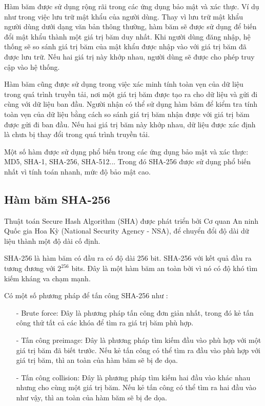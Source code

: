 Hàm băm được sử dụng rộng rãi trong các ứng dụng bảo mật và xác thực. Ví dụ như trong việc lưu trữ
mật khẩu của người dùng. Thay vì lưu trữ mật khẩu người dùng dưới dạng văn bản thông thường, hàm 
băm sẽ được sử dụng để biến đổi mật khẩu thành một giá trị băm duy nhất. Khi người dùng đăng nhập, 
hệ thống sẽ so sánh giá trị băm của mật khẩu được nhập vào với giá trị băm đã được lưu trữ. Nếu hai 
giá trị này khớp nhau, người dùng sẽ được cho phép truy cập vào hệ thống.

Hàm băm cũng được sử dụng trong việc xác minh tính toàn vẹn của dữ liệu trong quá trình truyền tải, 
nơi một giá trị băm được tạo ra cho dữ liệu và gửi đi cùng với dữ liệu ban đầu. Người nhận có thể 
sử dụng hàm băm để kiểm tra tính toàn vẹn của dữ liệu bằng cách so sánh giá trị băm nhận được với 
giá trị băm được gửi đi ban đầu. Nếu hai giá trị băm này khớp nhau, dữ liệu được xác định là chưa 
bị thay đổi trong quá trình truyền tải.

Một số hàm được sử dụng phổ biến trong các ứng dụng bảo mật và xác thực: MD5, SHA-1, SHA-256, SHA-512...
Trong đó SHA-256 được sử dụng phổ biến nhất vì tính toán nhanh, mức độ bảo mật cao.
\subsection{Hàm băm SHA-256}
Thuật toán Secure Hash Algorithm (SHA) được phát triển bởi Cơ quan An ninh
Quốc gia Hoa Kỳ (National Security Agency - NSA), để chuyển đổi độ dài dữ liệu thành một độ dài cố định.

SHA-256 là hàm băm có đầu ra có độ dài 256 bit. SHA-256 với kết quả đầu ra tương đương với $2^{256}$ bits.
Đây là một hàm băm an toàn bởi vì nó có độ khó tìm kiếm kháng va chạm mạnh. 

Có một số phương pháp để tấn công SHA-256 như :
\begin{itemize}
\item[-] Brute force: Đây là phương pháp tấn công đơn giản nhất, trong đó kẻ tấn công
thử tất cả các khóa để tìm ra giá trị băm phù hợp. 
\item[-] Tấn công preimage: Đây là phương pháp tìm kiếm đầu vào phù hợp với một giá 
trị băm đã biết trước. Nếu kẻ tấn công có thể tìm ra đầu vào phù hợp với giá trị băm, thì an toàn của hàm băm sẽ bị đe dọa.
\item[-] Tấn công collision: Đây là phương pháp tìm kiếm hai đầu vào khác nhau nhưng cho
cùng một giá trị băm. Nếu kẻ tấn công có thể tìm ra hai đầu vào như vậy, thì an toàn của hàm băm sẽ bị đe dọa.
\end{itemize}


